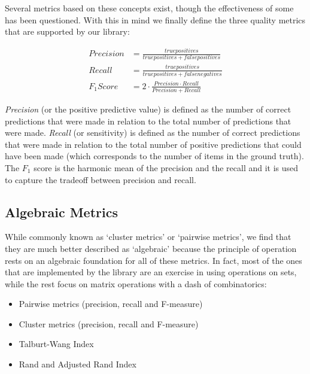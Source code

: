 \documentclass[11pt]{article}
\begin{document}
    Several metrics based on these concepts exist, though the effectiveness of
    some has been questioned\cite{Goga2015}.
    With this in mind we finally define the three quality metrics that are
    supported by our library:

    \begin{align}
    Precision&=\frac{true positives}{true positives + false positives} \\
    Recall&=\frac{true positives}{true positives + false negatives} \\
    F_1 Score&=2 \cdot \frac{Precision \cdot Recall}{Precision+Recall}
    \end{align}

    \textit{Precision} (or the positive predictive value) is defined as the
    number of correct predictions that were made in relation to the total number
    of predictions that were made.
    \textit{Recall} (or sensitivity) is defined as the number of correct
    predictions that were made in relation to the total number of positive
    predictions that could have been made (which corresponds to the number of
    items in the ground truth).
    The \textit{$F_1$} score is the harmonic mean of the precision and the
    recall and it is used to capture the tradeoff between precision and
    recall\cite{hitesh2012}.

    \subsection{Algebraic Metrics}
    While commonly known as `cluster metrics'\cite{rand1971,hitesh2012} or
    `pairwise metrics'\cite{hitesh2012,Men10}, we find that they are much better
    described as `algebraic' because the principle of operation rests on an
    algebraic foundation for all of these metrics.
    In fact, most of the ones that are implemented by the library are an
    exercise in using operations on sets, while the rest focus on matrix
    operations with a dash of combinatorics:
    \begin{itemize}
        \item Pairwise metrics (precision, recall and F-measure)\cite{Men10,hitesh2012}
        \item Cluster metrics (precision, recall and F-measure)\cite{huang2006efficient,hitesh2012}
        \item Talburt-Wang Index\cite{tal2007algebraic}
        \item Rand\cite{rand1971} and Adjusted Rand Index\cite{adjrand1985}
    \end{itemize}
    
\end{document}
